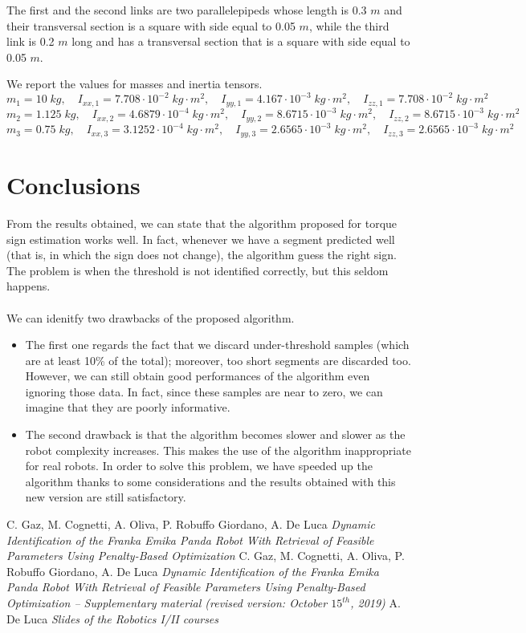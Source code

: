 \documentclass{article}
\begin{document}
The first and the second links are two parallelepipeds whose length is 0.3 $m$ and their transversal section is a square with side equal to 0.05 $m$, while the third link is 0.2 $m$ long and has a transversal section that is a square with side equal to 0.05 $m$.

We report the  values for masses and inertia tensors.
\[m_1 = 10 \;kg,\quad I_{xx,1} = 7.708\cdot 10^{-2}\;kg\cdot m^2,\quad I_{yy,1} = 4.167 \cdot 10^{-3}\;kg\cdot m^2,\quad I_{zz,1} = 7.708\cdot 10^{-2}\;kg\cdot m^2\]
\[ m_2 = 1.125\;kg,\quad I_{xx,2} = 4.6879\cdot10^{-4}\;kg\cdot m^2,\quad I_{yy,2} = 8.6715\cdot 10^{-3}\;kg\cdot m^2,\quad I_{zz,2} = 8.6715\cdot 10^{-3}\;kg\cdot m^2\]
\[m_3 = 0.75\;kg,\quad I_{xx,3} = 3.1252\cdot 10^{-4}\;kg\cdot m^2,\quad I_{yy,3} = 2.6565\cdot 10^{-3}\;kg\cdot m^2,\quad I_{zz,3} = 2.6565\cdot 10^{-3}\;kg\cdot m^2\]

\clearpage

\section{Conclusions}
From the results obtained, we can state that the algorithm proposed for torque sign estimation works well. In fact, whenever we have a segment predicted well (that is, in which the sign does not change), the algorithm guess the right  sign. The problem is when the threshold is not identified correctly, but this seldom happens. \\\\

We can idenitfy two drawbacks of the proposed algorithm. 
\begin{itemize}
\item The first one regards the fact that we discard under-threshold samples (which are at least 10\% of the total); moreover, too short segments are discarded too.  However,  we can still obtain good performances of the algorithm even ignoring those data. In fact, since these samples are near to zero, we can imagine that they are poorly informative.
\item The second drawback is that the algorithm becomes slower and slower as the robot complexity increases. This makes the use of the algorithm inappropriate for real robots. In order to solve this problem, we have speeded up the algorithm thanks to some considerations and the results obtained with this new version are still satisfactory.
\end{itemize}

\clearpage

\begin{thebibliography}{}
C. Gaz, M. Cognetti, A. Oliva, P. Robuffo Giordano, A. De Luca
\emph {Dynamic Identification of the Franka Emika Panda Robot With Retrieval of Feasible Parameters Using Penalty-Based Optimization}
C. Gaz, M. Cognetti, A. Oliva, P. Robuffo Giordano, A. De Luca
\emph {Dynamic Identification of the Franka Emika Panda Robot With Retrieval of Feasible Parameters Using Penalty-Based Optimization – Supplementary material (revised version: October $15^{th}$, 2019)}
A. De Luca
\emph {Slides of the Robotics I/II courses}
\end{thebibliography}
\end{document}

